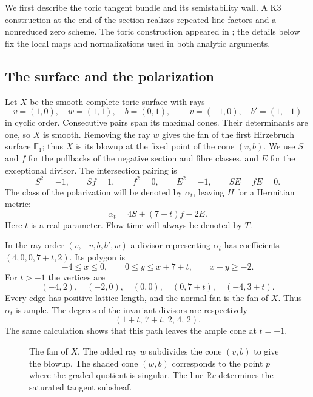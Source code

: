 \documentclass[11pt]{amsart}
\theoremstyle{definition}
\theoremstyle{remark}
\newcommand{\RR}{\mathbb R}
\begin{document}
We first describe the toric tangent bundle and its semistability wall.
A K3 construction at the end of the section realizes repeated line
factors and a nonreduced zero scheme. The toric construction
appeared in \cite[Example~4.3]{wuebben2026}; the details below fix the local
maps and normalizations used in both analytic arguments.

\subsection{The surface and the polarization}
Let $X$ be the smooth complete toric surface with rays
\begin{equation}\label{eq:rays}
 v=(1,0),\quad w=(1,1),\quad b=(0,1),\quad -v=(-1,0),\quad b'=(1,-1)
\end{equation}
in cyclic order. Consecutive pairs span its maximal cones. Their determinants
are one, so $X$ is smooth. Removing the ray $w$ gives the fan of the first
Hirzebruch surface $\mathbb F_1$; thus $X$ is its blowup at the fixed point
of the cone $(v,b)$. We use $S$ and $f$ for the pullbacks of the negative
section and fibre classes, and $E$ for the exceptional divisor. The
intersection pairing is
\begin{equation}\label{eq:intersection}
 S^2=-1,\qquad S f=1,\qquad f^2=0,\qquad E^2=-1,\qquad SE=fE=0.
\end{equation}
The class of the polarization will be denoted by $\alpha_t$, leaving $H$
for a Hermitian metric:
\begin{equation}\label{eq:polarization}
 \alpha_t=4S+(7+t)f-2E.
\end{equation}
Here $t$ is a real parameter. Flow time will always be denoted by $T$.

In the ray order $(v,-v,b,b',w)$ a divisor representing $\alpha_t$ has
coefficients $(4,0,0,7+t,2)$. Its polygon is
\[
 -4\le x\le0,\qquad 0\le y\le x+7+t,\qquad x+y\ge-2.
\]
For $t>-1$ the vertices are
\[
 (-4,2),\quad(-2,0),\quad(0,0),\quad(0,7+t),\quad(-4,3+t).
\]
Every edge has positive lattice length, and the normal fan is the fan
of $X$. Thus $\alpha_t$ is ample. The degrees of the invariant divisors
are respectively
\begin{equation}\label{eq:divisor-degrees}
 (1+t,\,7+t,\,2,\,4,\,2).
\end{equation}
The same calculation shows that this path leaves the ample cone at
$t=-1$.

\begin{figure}[htbp]
\centering

\caption{The fan of $X$. The added ray $w$ subdivides the cone $(v,b)$
to give the blowup. The shaded cone $(w,b)$ corresponds to the point $p$
where the graded quotient is singular. The line $\RR v$ determines the
saturated tangent subsheaf.}
\label{fig:fan}
\end{figure}
\end{document}
